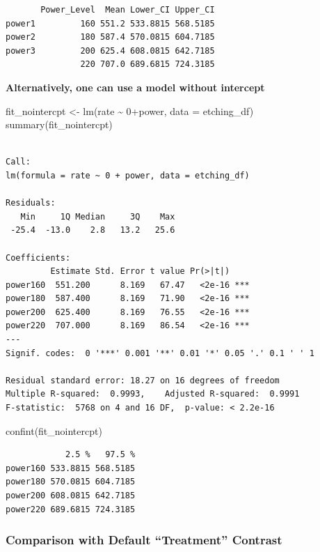 \documentclass[
  letterpaper,
]{scrbook}
\newenvironment{Shaded}{\begin{snugshade}}{\end{snugshade}}
\newcommand{\AttributeTok}[1]{\textcolor[rgb]{0.40,0.45,0.13}{#1}}
\newcommand{\DecValTok}[1]{\textcolor[rgb]{0.68,0.00,0.00}{#1}}
\newcommand{\FunctionTok}[1]{\textcolor[rgb]{0.28,0.35,0.67}{#1}}
\newcommand{\NormalTok}[1]{\textcolor[rgb]{0.00,0.23,0.31}{#1}}
\newcommand{\OtherTok}[1]{\textcolor[rgb]{0.00,0.23,0.31}{#1}}
\newcommand{\SpecialCharTok}[1]{\textcolor[rgb]{0.37,0.37,0.37}{#1}}
\begin{document}
\begin{verbatim}
       Power_Level  Mean Lower_CI Upper_CI
power1         160 551.2 533.8815 568.5185
power2         180 587.4 570.0815 604.7185
power3         200 625.4 608.0815 642.7185
               220 707.0 689.6815 724.3185
\end{verbatim}

\textbf{Alternatively, one can use a model without intercept}

\begin{Shaded}
\begin{Highlighting}[]
\NormalTok{fit\_nointercpt }\OtherTok{\textless{}{-}} \FunctionTok{lm}\NormalTok{(rate }\SpecialCharTok{\textasciitilde{}} \DecValTok{0}\SpecialCharTok{+}\NormalTok{power, }\AttributeTok{data =}\NormalTok{ etching\_df)}
\FunctionTok{summary}\NormalTok{(fit\_nointercpt)}
\end{Highlighting}
\end{Shaded}

\begin{verbatim}

Call:
lm(formula = rate ~ 0 + power, data = etching_df)

Residuals:
   Min     1Q Median     3Q    Max 
 -25.4  -13.0    2.8   13.2   25.6 

Coefficients:
         Estimate Std. Error t value Pr(>|t|)    
power160  551.200      8.169   67.47   <2e-16 ***
power180  587.400      8.169   71.90   <2e-16 ***
power200  625.400      8.169   76.55   <2e-16 ***
power220  707.000      8.169   86.54   <2e-16 ***
---
Signif. codes:  0 '***' 0.001 '**' 0.01 '*' 0.05 '.' 0.1 ' ' 1

Residual standard error: 18.27 on 16 degrees of freedom
Multiple R-squared:  0.9993,    Adjusted R-squared:  0.9991 
F-statistic:  5768 on 4 and 16 DF,  p-value: < 2.2e-16
\end{verbatim}

\begin{Shaded}
\begin{Highlighting}[]
\FunctionTok{confint}\NormalTok{(fit\_nointercpt)}
\end{Highlighting}
\end{Shaded}

\begin{verbatim}
            2.5 %   97.5 %
power160 533.8815 568.5185
power180 570.0815 604.7185
power200 608.0815 642.7185
power220 689.6815 724.3185
\end{verbatim}

\subsubsection{Comparison with Default ``Treatment''
Contrast}\label{comparison-with-default-treatment-contrast}
\end{document}
